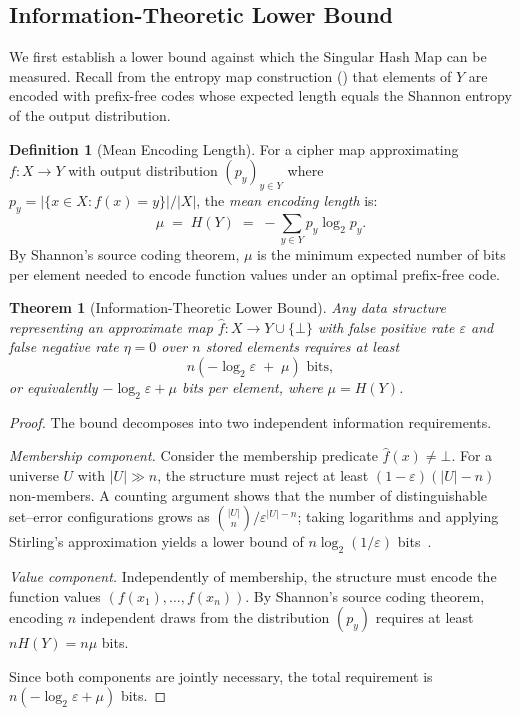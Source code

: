 \documentclass[11pt]{article}
\theoremstyle{definition}
\newtheorem{definition}{Definition}[section]
\theoremstyle{plain}
\newtheorem{theorem}{Theorem}[section]
\theoremstyle{remark}
\begin{document}
\subsection{Information-Theoretic Lower Bound}

We first establish a lower bound against which the Singular Hash Map can be measured.
Recall from the entropy map construction () that elements of $Y$ are encoded with prefix-free codes whose expected length equals the Shannon entropy of the output distribution.

\begin{definition}[Mean Encoding Length]
\label{def:mean-encoding-length}
For a cipher map approximating $f : X \to Y$ with output distribution $(p_y)_{y \in Y}$ where $p_y = |\{x \in X : f(x) = y\}| / |X|$, the \emph{mean encoding length} is:
$$\mu \;=\; H(Y) \;=\; -\sum_{y \in Y} p_y \log_2 p_y.$$
By Shannon's source coding theorem, $\mu$ is the minimum expected number of bits per element needed to encode function values under an optimal prefix-free code.
\end{definition}

\begin{theorem}[Information-Theoretic Lower Bound]
\label{thm:lower-bound}
Any data structure representing an approximate map $\hat{f} : X \to Y \cup \{\bot\}$ with false positive rate $\varepsilon$ and false negative rate $\eta = 0$ over $n$ stored elements requires at least
$$n\!\left(-\log_2 \varepsilon \;+\; \mu\right) \text{ bits},$$
or equivalently $-\log_2 \varepsilon + \mu$ bits per element, where $\mu = H(Y)$.
\end{theorem}

\begin{proof}
The bound decomposes into two independent information requirements.

\emph{Membership component.}
Consider the membership predicate $\hat{f}(x) \neq \bot$.
For a universe $U$ with $|U| \gg n$, the structure must reject at least $(1 - \varepsilon)(|U| - n)$ non-members.
A counting argument shows that the number of distinguishable set--error configurations grows as $\binom{|U|}{n} / \varepsilon^{|U|-n}$;
taking logarithms and applying Stirling's approximation yields a lower bound of $n \log_2(1/\varepsilon)$ bits~\cite{bloom1970space}.

\emph{Value component.}
Independently of membership, the structure must encode the function values $(f(x_1), \ldots, f(x_n))$.
By Shannon's source coding theorem, encoding $n$ independent draws from the distribution $(p_y)$ requires at least $n H(Y) = n\mu$ bits.

Since both components are jointly necessary, the total requirement is $n(-\log_2 \varepsilon + \mu)$ bits.
\end{proof}
\end{document}
